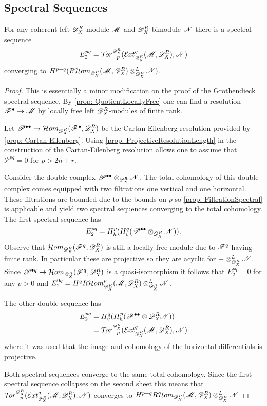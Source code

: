 \subsection{Spectral Sequences}
\begin{proposition}
  For any coherent left $\mathscr{D}_X^R$-module $\mathscr{M}$ and $\mathscr{D}_X^R$-bimodule $\mathscr{N}$ there is a spectral sequence
  $$E_2^{pq}= \Tr{\D_X^R}{-p}(\Ex{\D_X^R}{q}(\M,\D_X^R), \N) $$
  converging to $H^{p+q} (R\mathcal{H}om_{\mathscr{D}_X^R}(\mathscr{M},\mathscr{D}_X^R)\otimes_{\mathscr{D}_X^R}^L \mathscr{N}).$
\end{proposition}
\begin{proof}
  This is essentially a minor modification on the proof of the Grothendieck spectral sequence.
  By \cref{prop: QuotientLocallyFree} one can find a resolution $\mathscr{F}^\bullet \to \mathscr{M}$ by locally free left $\mathscr{D}_X^R$-modules of finite rank.

  Let $\mathscr{P}^{\bullet\bullet}\to \mathcal{H}om_{\mathscr{D}_X^R}(\mathscr{F}^{\bullet},\mathscr{D}_X^R)$ be the Cartan-Eilenberg resolution provided by \cref{prop: Cartan-Eilenberg}.
  Using \cref{prop: ProjectiveResolutionLength} in the construction of the Cartan-Eilenberg resolution allows one to assume that $\mathscr{P}^{pq}=0$ for $p>2n + r$.

  Consider the double complex $\mathscr{P}^{\bullet \bullet}\otimes_{\mathscr{D}_X^R}\mathscr{N}$.
  The total cohomology of this double complex comes equipped with two filtrations one vertical and one horizontal.
  These filtrations are bounded due to the bounds on $p$ so \cref{prop: FiltrationSpectral} is applicable and yield two spectral sequences converging to the total cohomology.
  The first spectral sequence has
  $$E_{2}^{pq} = H^p_h(H^q_v( \mathscr{P}^{\bullet \bullet}\otimes_{\mathscr{D}_X^R}\mathscr{N})).$$
  Observe that $\mathcal{H}om_{\mathscr{D}_X^R}(\mathscr{F}^q, \mathscr{D}_X^R)$ is still a locally free module due to $\mathscr{F}^q$ having finite rank.
  In particular these are projective so they are acyclic for ${-}\otimes_{\mathscr{D}_X^R}^L \mathscr{N}$.
  Since $\mathscr{P}^{\bullet q}\to \mathcal{H}om_{\mathscr{D}_X^R}(\mathscr{F}^q,\mathscr{D}_X^R)$ is a quasi-isomorphism it follows that $E_2^{pq}=0$ for any $p>0$ and $E_2^{0q} = H^{q} R\mathcal{H}om_{\mathscr{D}_X^R}^p(\mathscr{M},\mathscr{D}_X^R)\otimes_{\mathscr{D}_X^R}^L \mathscr{N}$.

  The other double sequence has
  \begin{align*}
      E_2^{pq} &= H^q_v(H^p_h(\mathscr{P}^{\bullet\bullet}\otimes \D_X^R\N))\\
      &=  \Tr{\D_X^R}{-p}(\Ex{\D_X^R}{q}(\M,\D_X^R), \N)
  \end{align*}
  where it was used that the image and cohomology of the horizontal differentials is projective.

  Both spectral sequences converge to the same total cohomology.
  Since the first spectral sequence collapses on the second sheet this means that $\Tr{\D_X^R}{-p}(\Ex{\D_X^R}{q}(\M,\D_X^R), \N)$ converges to $H^{p+q} R\mathcal{H}om_{\mathscr{D}_X^R}(\mathscr{M},\mathscr{D}_X^R)\otimes_{\mathscr{D}_X^R}^L \mathscr{N}$
\end{proof}
